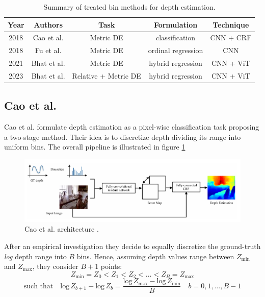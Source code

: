 \begin{center}
	\begin{table}
		\begin{tabular}{| c | c | c | c | c |}
		\hline
		\textbf{Year} & \textbf{Authors} & \textbf{Task} & \textbf{Formulation} & \textbf{Technique} \\
		\hline
		2018 &  Cao et al. \cite{depth_as_classification} & Metric DE & classification & CNN + CRF \\
		2018 & Fu et al. \cite{ordinal_regression} & Metric DE & ordinal regression & CNN \\
		2021 & Bhat et al. \cite{AdaBins} & Metric DE & hybrid regression & CNN + ViT\\
		2023 & Bhat et al. \cite{ZoeDepth} & Relative + Metric DE & hybrid regression & CNN + ViT\\
		\hline
		\end{tabular}
	\caption{Summary of treated bin methods for depth estimation. \label{table:2}}
	\end{table}
\end{center}

\subsection{Cao et al.}
Cao et al. \cite{depth_as_classification} formulate depth estimation as a pixel-wise classification task proposing a two-stage method.
Their idea is to discretize depth dividing its range into uniform bins.
The overall pipeline is illustrated in figure \ref{fig:depth_as_classification}

\begin{figure}
	\centering
	\includegraphics[scale=0.35]{figs/depth_classification}
	\caption{Cao et al. architecture \cite{depth_as_classification}. \label{fig:depth_as_classification}}
\end{figure}

After an empirical investigation they decide to equally discretize the ground-truth \textit{log} depth range into $B$ bins.
Hence, assuming depth values range between $Z_{\text{min}}$ and $Z_{\text{max}}$, they consider $B+1$ points:
\[
	Z_{\text{min}}=Z_{0} < Z_{1} < Z_{2} < \dotsc < Z_{B} = Z_{\text{max}}
\]\[
	\text{such that} \quad \text{log} \, Z_{b+1} - \text{log} \, Z_{b} =
	\frac{\text{log} \, Z_{\text{max}} - \text{log} \, Z_{\text{min}}}{B}
	\quad b = 0, 1, \dotsc, B-1
\]

